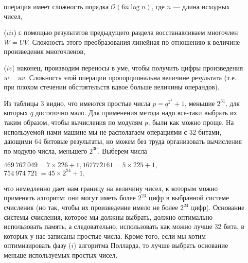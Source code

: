 \documentclass{mai_book}
\begin{document}
\hspace{-14pt}операция имеет сложность порядка $\mathcal{O}(6n\log{}n)$, где $n$ --- длина исходных чисел, \par
  ($iii$) с помощью результатов предыдущего раздела 
восстанавливаем многочлен $W = UV$. Сложность этого преобразования линейная по отношению к величине произведения многочленов, \par
 ($iv$) наконец, производим переносы в уме, чтобы получить цифры
произведения $w = uv$. Сложность этой операции пропорциональна 
величине результата (т.е. при плохом стечении обстоятельств вдвое больше
величины операндов).\par
 Из таблицы 3 видно, что имеются простые числа $p = q^{2^{k}} + 1$, 
меньшие $2^{31}$, для которых $q$ достаточно мало. Для применения метода надо
все-таки выбрать их таким образом, чтобы вычисления по модулям $p$,
были как можно проще. На используемой нами машине мы не располагаем операциями с 32 битами, дающими 64 битовые результаты, но можем без труда организовать вычисления по модулю числа, меньшего $2^{30}$. Выберем числа
\begin{center}
$469\ 762\ 049 = 7 \times 226 + 1, 167 772 161 = 5 \times 225 + 1,$ \\
$754\ 974\ 721\ = 45 \times 2^{24} + 1,$
\end{center}
что немедленно дает нам границу на величину чисел, к которым 
можно применять алгоритм: они могут иметь более $2^{23}$ цифр в выбранной
системе счисления (но так, чтобы их произведение имело не более $2^{24}$
цифр). Основание системы счисления, которое мы должны выбрать, должно оптимально использовать память, а следовательно, использовать как можно лучше 32 бита, в которых у нас записаны простые числа. Кроме того, если мы хотим оптимизировать фазу ($i$) алгоритма Полларда, то лучше выбрать основание меньше используемых простых чисел. 
\end{document}
